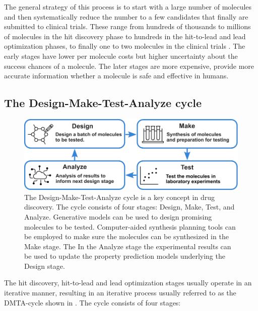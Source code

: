 The general strategy of this process is to start with a large number of molecules and then
systematically reduce the number to a few candidates that finally are submitted to clinical trials.
These range from hundreds of thousands to millions of molecules in the hit discovery phase to hundreds
in the hit-to-lead and lead optimization phases, to finally one to two molecules in the clinical trials \citep{hughesPrinciplesEarlyDrug2011}.
The early stages have lower per molecule costs but higher uncertainty about the success
chances of a molecule. The later stages are more expensive, provide more accurate information
whether a molecule is safe and effective in humans.

\subsection{The Design-Make-Test-Analyze cycle}
\begin{figure}
      \centering
      \includegraphics[width=\textwidth]{figures/dmta_cycle_v2.pdf}
      \caption{The Design-Make-Test-Analyze cycle is a key concept in drug discovery. The cycle
            consists of four stages: Design, Make, Test, and Analyze. Generative models can be used
            to design promising molecules to be tested. Computer-aided synthesis planning tools can
            be employed to make sure the molecules can be synthesized in the Make stage. The
            In the Analyze stage the experimental results can be used to update the property prediction
            models underlying the Design stage.
            \label{fig:dmta-cycle}}
\end{figure}
The hit discovery, hit-to-lead and lead optimization stages usually operate in an iterative manner,
resulting in an iterative process usually referred to as the \ac{DMTA}-cycle \citep{wesolowskiStrategiesPoliticsSuccessful2016}
shown in . The cycle consists of four stages:
